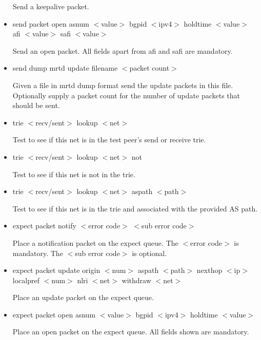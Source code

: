\documentclass[11pt]{article}
\begin{document}
\begin{itemize}
  Send a keepalive packet.

\item {\sf send packet open
                        asnum $<$value$>$ 
                        bgpid $<$ipv4$>$ 
                        holdtime $<$value$>$
			afi $<$value$>$
			safi $<$value$>$}

  Send an open packet.  All fields apart from afi and safi are mandatory.

\item {\sf send dump mrtd update filename $<$packet count$>$}
  
  Given a file in mrtd dump format send the update packets in this
  file. Optionally supply a packet count for the number of update
  packets that should be sent.

\item {\sf trie $<$recv/sent$>$ lookup $<$net$>$}

  Test to see if this net is in the test peer's send or receive trie.

\item {\sf trie $<$recv/sent$>$ lookup $<$net$>$ not}

  Test to see if this net is not in the trie.

\item {\sf trie $<$recv/sent$>$ lookup $<$net$>$ aspath $<$path$>$}

  Test to see if this net is in the trie and associated with the
  provided AS path.

\item {\sf expect packet notify $<$error code$>$ $<$sub error code$>$}

  Place a notification packet on the expect queue. The $<$error code$>$ is
  mandatory. The $<$sub error code$>$ is optional.
  
\item {\sf expect packet update 
                    origin $<$num$>$ 
                    aspath $<$path$>$ 
                    nexthop $<$ip$>$ 
                    localpref $<$num$>$
                    nlri $<$net$>$
                    withdraw $<$net$>$}

  Place an update packet on the expect queue.

\item {\sf expect packet open 
                        asnum $<$value$>$ 
                        bgpid $<$ipv4$>$ 
                        holdtime $<$value$>$}

  Place an open packet on the expect queue. All fields shown are mandatory.


\end{itemize}
\end{document}
